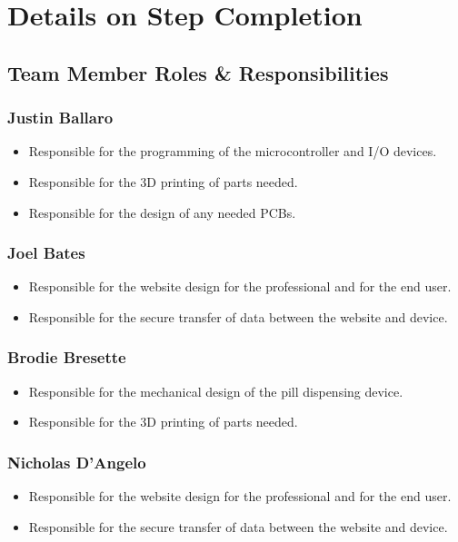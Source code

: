 \documentclass[12pt,titlepage]{article}
\begin{document}
\section{Details on Step Completion}
\subsection{Team Member Roles \& Responsibilities}
\subsubsection{Justin Ballaro}
\begin{itemize}
    \item Responsible for the programming of the microcontroller and I/O devices.
    \item Responsible for the 3D printing of parts needed.
    \item Responsible for the design of any needed PCBs.
\end{itemize}
\subsubsection{Joel Bates}
\begin{itemize}
    \item Responsible for the website design for the professional and for the end user.
    \item Responsible for the secure transfer of data between the website and device.
\end{itemize}
\subsubsection{Brodie Bresette}
\begin{itemize}
    \item Responsible for the mechanical design of the pill dispensing device.
    \item Responsible for the 3D printing of parts needed.
\end{itemize}
\subsubsection{Nicholas D'Angelo}
\begin{itemize}
    \item Responsible for the website design for the professional and for the end user.
    \item Responsible for the secure transfer of data between the website and device.
\end{itemize}
\end{document}
